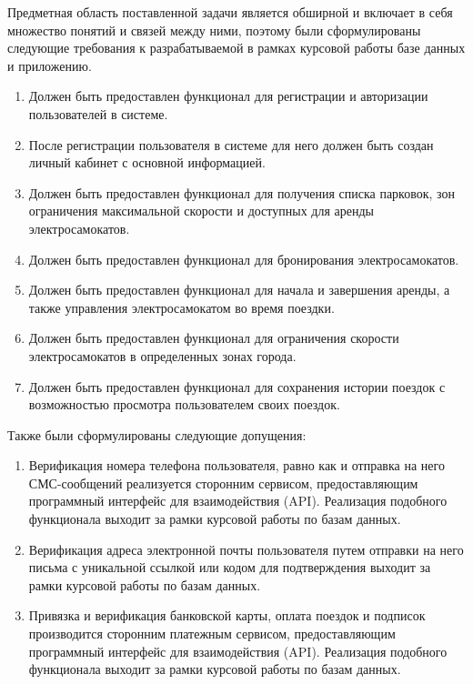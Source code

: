 Предметная область поставленной задачи является обширной и включает в себя множество понятий и связей между ними, поэтому были сформулированы следующие требования к разрабатываемой в рамках курсовой работы базе данных и приложению.

\begin{enumerate}
	\item Должен быть предоставлен функционал для регистрации и авторизации пользователей в системе.
	\item После регистрации пользователя в системе для него должен быть создан личный кабинет с основной информацией.
	\item Должен быть предоставлен функционал для получения списка парковок, зон ограничения максимальной скорости и доступных для аренды электросамокатов.
	\item Должен быть предоставлен функционал для бронирования электросамокатов.
	\item Должен быть предоставлен функционал для начала и завершения аренды, а также управления электросамокатом во время поездки.
	\item Должен быть предоставлен функционал для ограничения скорости электросамокатов в определенных зонах города.
	\item Должен быть предоставлен функционал для сохранения истории поездок с возможностью просмотра пользователем своих поездок.
\end{enumerate}

Также были сформулированы следующие допущения:

\begin{enumerate}
	\item Верификация номера телефона пользователя, равно как и отправка на него СМС-сообщений реализуется сторонним сервисом, предоставляющим программный интерфейс для взаимодействия (API). Реализация подобного функционала выходит за рамки курсовой работы по базам данных.
	\item Верификация адреса электронной почты пользователя путем отправки на него письма с уникальной ссылкой или кодом для подтверждения выходит за рамки курсовой работы по базам данных.
	\item Привязка и верификация банковской карты, оплата поездок и подписок производится сторонним платежным сервисом, предоставляющим программный интерфейс для взаимодействия (API). Реализация подобного функционала выходит за рамки курсовой работы по базам данных.
\end{enumerate}

